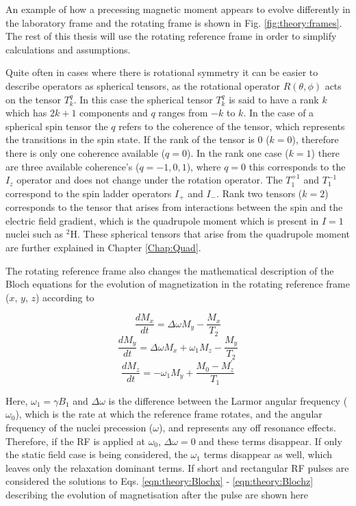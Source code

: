 An example of how a precessing magnetic moment appears to evolve differently in the laboratory frame and the rotating frame is shown in Fig. \ref{fig:theory:frames}. The rest of this thesis will use the rotating reference frame in order to simplify calculations and assumptions. 

Quite often in cases where there is rotational symmetry it can be easier to describe operators as spherical tensors, as the rotational operator $R(\theta,\phi)$ acts on the tensor $T^q_k$. In this case the spherical tensor $T_k^{q}$ is said to have a rank $k$ which has $2k+1$ components and $q$ ranges from $-k$ to $k$. In the case of a spherical spin tensor the $q$ refers to the coherence of the tensor, which represents the transitions in the spin state. If the rank of the tensor is 0 ($k = 0$), therefore there is only one coherence available ($q = 0$). In the rank one case ($k=1$) there are three available coherence's ($q=-1,0,1$), where $q=0$ this corresponds to the $I_z$ operator and does not change under the rotation operator. The $T_1^{+1}$ and $T_1^{-1}$ correspond to the spin ladder operators $I_+$ and $I_-$. Rank two tensors ($k=2$) corresponds to the tensor that arises from interactions between the spin and the electric field gradient, which is the quadrupole moment which is present in $I=1$ nuclei such as $^2$H. These spherical tensors that arise from the quadrupole moment are further explained in Chapter \ref{Chap:Quad}.

The rotating reference frame also changes the mathematical description of the Bloch equations for the evolution of magnetization in the rotating reference frame ($x$, $y$, $z$) according to

\begin{equation}
    \frac{dM_x}{dt} = \Delta\omega M_y - \frac{M_x}{T_2}
    \label{eqn:theory:Blochx}
\end{equation}
\begin{equation}
    \frac{dM_y}{dt} = \Delta\omega M_x + \omega_1M_z - \frac{M_y}{T_2}
    \label{eqn:theory:Blochy}
\end{equation}
\begin{equation}
    \frac{dM_z}{dt} = -\omega_1M_y + \frac{M_0-M_z^{'}}{T_1}
    \label{eqn:theory:Blochz}
\end{equation}

Here, $\omega_1=\gamma B_1$ and $\Delta\omega$ is the difference between the Larmor angular frequency ($\omega_0$), which is the rate at which the reference frame rotates, and the angular frequency of the nuclei precession ($\omega$), and represents any off resonance effects. Therefore, if the \ac{RF} is applied at $\omega_0$, $\Delta\omega=0$ and these terms disappear. If only the static field case is being considered, the $\omega_1$ terms disappear as well, which leaves only the relaxation dominant terms. If short and rectangular \ac{RF} pulses are considered the solutions to Eqs. \ref{eqn:theory:Blochx} - \ref{eqn:theory:Blochz} describing the evolution of magnetisation after the pulse are shown here

